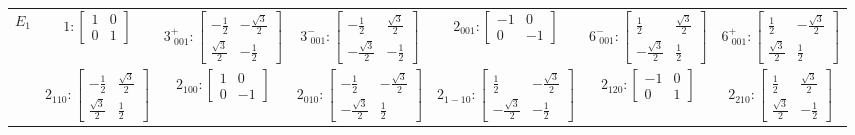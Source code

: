 \documentclass[fleqn,8pt,landscape]{jsarticle}
\begin{document}
\begin{longtable}{ccccccc}
$ E_{1} $ & $ 1:\begin{bmatrix} 1 & 0 \\ 0 & 1 \end{bmatrix} $ & $ 3^{+}_{\,\,001}:\begin{bmatrix} - \frac{1}{2} & - \frac{\sqrt{3}}{2} \\ \frac{\sqrt{3}}{2} & - \frac{1}{2} \end{bmatrix} $ & $ 3^{-}_{\,\,001}:\begin{bmatrix} - \frac{1}{2} & \frac{\sqrt{3}}{2} \\ - \frac{\sqrt{3}}{2} & - \frac{1}{2} \end{bmatrix} $ & $ 2{}_{001}:\begin{bmatrix} -1 & 0 \\ 0 & -1 \end{bmatrix} $ & $ 6^{-}_{\,\,001}:\begin{bmatrix} \frac{1}{2} & \frac{\sqrt{3}}{2} \\ - \frac{\sqrt{3}}{2} & \frac{1}{2} \end{bmatrix} $ & $ 6^{+}_{\,\,001}:\begin{bmatrix} \frac{1}{2} & - \frac{\sqrt{3}}{2} \\ \frac{\sqrt{3}}{2} & \frac{1}{2} \end{bmatrix} $ \\
& $ 2{}_{110}:\begin{bmatrix} - \frac{1}{2} & \frac{\sqrt{3}}{2} \\ \frac{\sqrt{3}}{2} & \frac{1}{2} \end{bmatrix} $ & $ 2{}_{100}:\begin{bmatrix} 1 & 0 \\ 0 & -1 \end{bmatrix} $ & $ 2{}_{010}:\begin{bmatrix} - \frac{1}{2} & - \frac{\sqrt{3}}{2} \\ - \frac{\sqrt{3}}{2} & \frac{1}{2} \end{bmatrix} $ & $ 2{}_{1-10}:\begin{bmatrix} \frac{1}{2} & - \frac{\sqrt{3}}{2} \\ - \frac{\sqrt{3}}{2} & - \frac{1}{2} \end{bmatrix} $ & $ 2{}_{120}:\begin{bmatrix} -1 & 0 \\ 0 & 1 \end{bmatrix} $ & $ 2{}_{210}:\begin{bmatrix} \frac{1}{2} & \frac{\sqrt{3}}{2} \\ \frac{\sqrt{3}}{2} & - \frac{1}{2} \end{bmatrix} $ \\ \hline

\end{longtable}
\end{document}
